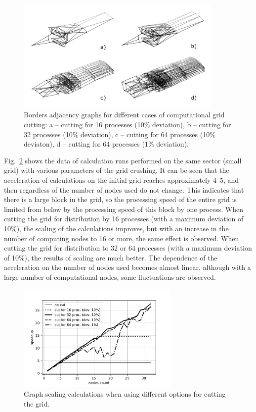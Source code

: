 \documentclass[
11pt,%
tightenlines,%
twoside,%
onecolumn,%
nofloats,%
nobibnotes,%
nofootinbib,%
superscriptaddress,%
noshowpacs,%
centertags]%
{revtex4}
\begin{document}
\begin{figure}[ht]
\setcaptionmargin{5mm}
\onelinecaptionsfalse
\includegraphics[width=0.9\textwidth]{pics/g_36_2.pdf}
\caption{Borders adjacency graphs for different
cases of computational grid cutting:  a -- cutting for 16 processes
(10\% deviation), b -- cutting for 32 processes (10\% deviation), c
-- cutting for 64 processes (10\% deviaton), d -- cutting for 64
processes (1\% deviation).} \label{fig:g_36_2}
\end{figure}

Fig.~\ref{fig:plot_36_scaling_2} shows the data of calculation runs
performed on the same sector (small grid) with various parameters of
the grid crushing. It can be seen that the acceleration of
calculations on the initial grid reaches approximately 4--5, and
then regardless of the number of nodes used do not change. This
indicates that there is a large block in the grid, so the processing
speed of the entire grid is limited from below by the processing
speed of this block by one process. When cutting the grid for
distribution by 16 processes (with a maximum deviation of 10\%), the
scaling of the calculations improves, but with an increase in the
number of computing nodes to 16 or more, the same effect is
observed. When cutting the grid for distribution to 32 or 64
processes (with a maximum deviation of 10\%), the results of scaling
are much better. The dependence of the acceleration on the number of
nodes used becomes almost linear, although with a large number of
computational nodes, some fluctuations are observed.

\begin{figure}[ht]
\setcaptionmargin{5mm}
\onelinecaptionstrue
\includegraphics[width=0.7\textwidth]{pics/plot_36_scaling_2.pdf}
\caption{Graph scaling calculations when  using
different options for cutting the grid.}
\label{fig:plot_36_scaling_2}
\end{figure}
\end{document}
